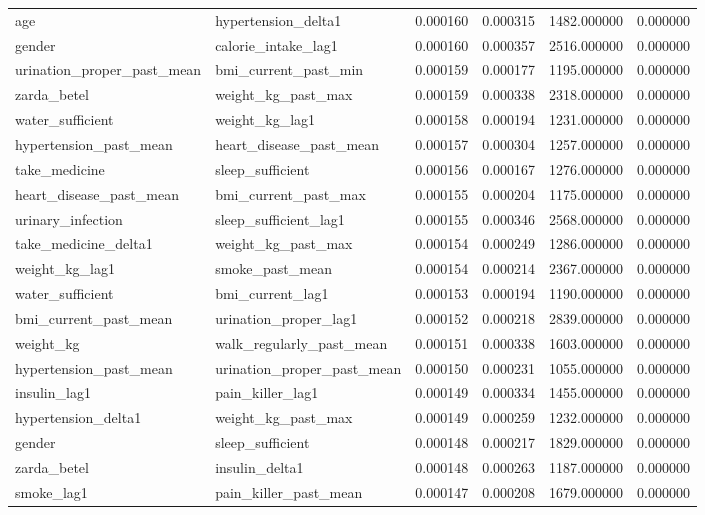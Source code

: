 \begin{longtable}{llrrrr}
age & hypertension\_delta1 & 0.000160 & 0.000315 & 1482.000000 & 0.000000 \\
gender & calorie\_intake\_lag1 & 0.000160 & 0.000357 & 2516.000000 & 0.000000 \\
urination\_proper\_past\_mean & bmi\_current\_past\_min & 0.000159 & 0.000177 & 1195.000000 & 0.000000 \\
zarda\_betel & weight\_kg\_past\_max & 0.000159 & 0.000338 & 2318.000000 & 0.000000 \\
water\_sufficient & weight\_kg\_lag1 & 0.000158 & 0.000194 & 1231.000000 & 0.000000 \\
hypertension\_past\_mean & heart\_disease\_past\_mean & 0.000157 & 0.000304 & 1257.000000 & 0.000000 \\
take\_medicine & sleep\_sufficient & 0.000156 & 0.000167 & 1276.000000 & 0.000000 \\
heart\_disease\_past\_mean & bmi\_current\_past\_max & 0.000155 & 0.000204 & 1175.000000 & 0.000000 \\
urinary\_infection & sleep\_sufficient\_lag1 & 0.000155 & 0.000346 & 2568.000000 & 0.000000 \\
take\_medicine\_delta1 & weight\_kg\_past\_max & 0.000154 & 0.000249 & 1286.000000 & 0.000000 \\
weight\_kg\_lag1 & smoke\_past\_mean & 0.000154 & 0.000214 & 2367.000000 & 0.000000 \\
water\_sufficient & bmi\_current\_lag1 & 0.000153 & 0.000194 & 1190.000000 & 0.000000 \\
bmi\_current\_past\_mean & urination\_proper\_lag1 & 0.000152 & 0.000218 & 2839.000000 & 0.000000 \\
weight\_kg & walk\_regularly\_past\_mean & 0.000151 & 0.000338 & 1603.000000 & 0.000000 \\
hypertension\_past\_mean & urination\_proper\_past\_mean & 0.000150 & 0.000231 & 1055.000000 & 0.000000 \\
insulin\_lag1 & pain\_killer\_lag1 & 0.000149 & 0.000334 & 1455.000000 & 0.000000 \\
hypertension\_delta1 & weight\_kg\_past\_max & 0.000149 & 0.000259 & 1232.000000 & 0.000000 \\
gender & sleep\_sufficient & 0.000148 & 0.000217 & 1829.000000 & 0.000000 \\
zarda\_betel & insulin\_delta1 & 0.000148 & 0.000263 & 1187.000000 & 0.000000 \\
smoke\_lag1 & pain\_killer\_past\_mean & 0.000147 & 0.000208 & 1679.000000 & 0.000000 \\

\end{longtable}
